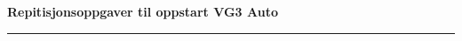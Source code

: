 \centerline{\bf Repitisjonsoppgaver til oppstart VG3 Auto}  \bigskip


\bigskip 
 
\hrule

\vfil \eject

